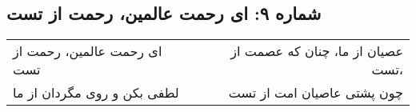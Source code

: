 \begin{center}
\section*{شماره ۹: ای رحمت عالمین، رحمت از تست}
\label{sec:009}
\begin{longtable}{l p{0.5cm} r}
ای رحمت عالمین، رحمت از تست
&&
عصیان از ما، چنان که عصمت از تست،
\\
لطفی بکن و روی مگردان از ما
&&
چون پشتی عاصیان امت از تست
\\
\end{longtable}
\end{center}
